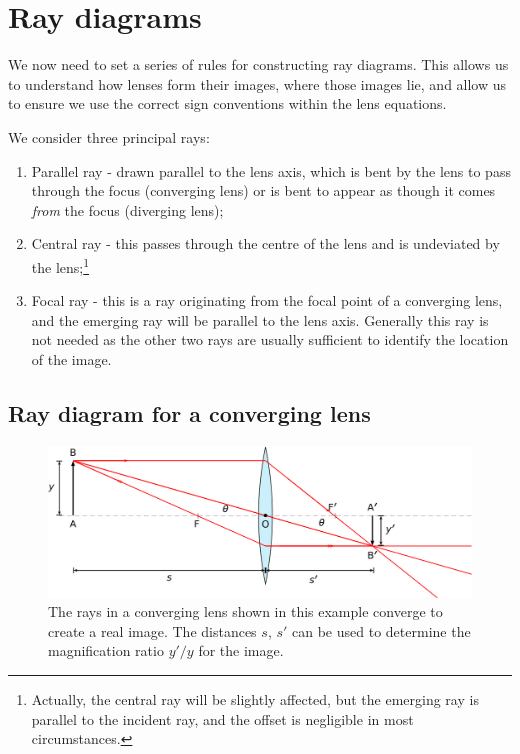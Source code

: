 \documentclass[
]{book}
\providecommand{\tightlist}{%
  \setlength{\itemsep}{0pt}\setlength{\parskip}{0pt}}
\begin{document}
\hypertarget{sec:ch16-raydiagrams1}{%
\section{Ray diagrams}\label{sec:ch16-raydiagrams1}}

We now need to set a series of rules for constructing ray diagrams. This allows us to understand how lenses form their images, where those images lie, and allow us to ensure we use the correct sign conventions within the lens equations.

We consider three principal rays:

\begin{enumerate}
\def\labelenumi{\arabic{enumi}.}
\tightlist
\item
  Parallel ray - drawn parallel to the lens axis, which is bent by the lens to pass through the focus (converging lens) or is bent to appear as though it comes \emph{from} the focus (diverging lens);
\item
  Central ray - this passes through the centre of the lens and is undeviated by the lens;\footnote{Actually, the central ray will be slightly affected, but the emerging ray is parallel to the incident ray, and the offset is negligible in most circumstances.}
\item
  Focal ray - this is a ray originating from the focal point of a converging lens, and the emerging ray will be parallel to the lens axis. Generally this ray is not needed as the other two rays are usually sufficient to identify the location of the image.
\end{enumerate}

\hypertarget{sec:ch16-rayconverge1}{%
\subsection{Ray diagram for a converging lens}\label{sec:ch16-rayconverge1}}

\begin{figure}

{\centering \includegraphics[width=0.7\linewidth]{visualisations/LaTeX/ch16-converginglens1} 

}

\caption{The rays in a converging lens shown in this example converge to create a real image. The distances $s$, $s'$ can be used to determine the magnification ratio $y'/y$ for the image.}\label{fig:ch16-rayconverge1}
\end{figure}
\end{document}
